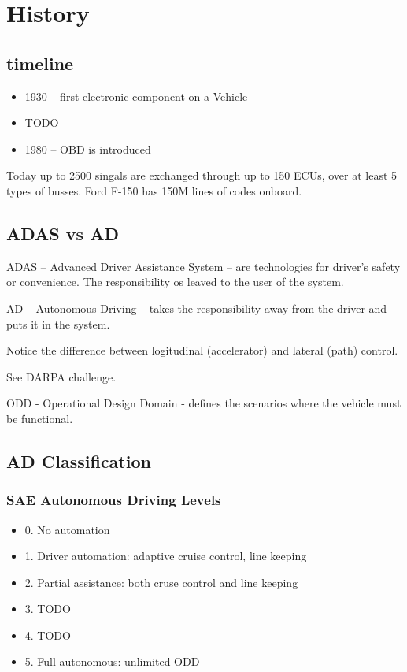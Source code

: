 \chapter{History}

\section{timeline}
\begin{itemize}
  \item 1930 -- first electronic component on a Vehicle
  \item TODO
  \item 1980 -- OBD is introduced
\end{itemize}

Today up to 2500 singals are exchanged through up to 150 ECUs, over at least 5 types of busses. Ford F-150 has 150M lines of codes onboard.

\section{ADAS vs AD}
ADAS -- Advanced Driver Assistance System -- are technologies for driver's safety or convenience. The responsibility os leaved to the user of the system.

AD -- Autonomous Driving -- takes the responsibility away from the driver and puts it in the system.

Notice the difference between logitudinal (accelerator) and lateral (path) control.

See DARPA challenge.

ODD - Operational Design Domain - defines the scenarios where the vehicle must be functional.

\section{AD Classification}

\subsection{SAE Autonomous Driving Levels}
\begin{itemize}
  \item 0. No automation
  \item 1. Driver automation: adaptive cruise control, line keeping
  \item 2. Partial assistance: both cruse control and line keeping
  \item 3. TODO
  \item 4. TODO
  \item 5. Full autonomous: unlimited ODD
\end{itemize}

